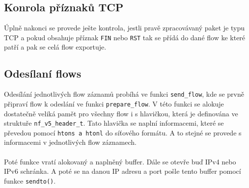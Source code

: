 \documentclass[12pt]{article}
\begin{document}
\subsection*{Konrola příznaků TCP}
Úplně nakonci se provede ješte kontrola, jestli pravě zpracovávaný paket je typu TCP a pokud obsahuje příznak \texttt{FIN} nebo \texttt{RST} tak se přídá do dané flow ke které patří a pak se celá flow exportuje.
\subsection{Odesílaní flows}
Odesílání jednotlivých flow záznamů probíhá ve funkci \texttt{send\_flow}, kde se prvně připraví flow k odeslání ve funkci \texttt{prepare\_flow}. V této funkci se alokuje dostatečně veliká pamět pro všechny flow i s hlavičkou, která je definována ve struktuře
\texttt{nf\_v5\_header\_t}. Tato hlavička se naplní informacemi, které se převedou pomocí \texttt{htons a htonl} do síťového formátu. A to stejné se provede s informacemi v jednotlivých flow záznamech.
\\\\
Poté funkce vratí alokovaný a naplněný buffer. Dále se otevře buď IPv4 nebo IPv6 schránka. A poté se na danou IP adresu a port pošle tento buffer pomocí funkce \texttt{sendto()}.
\end{document}
